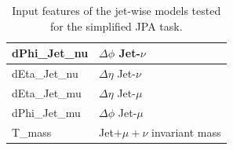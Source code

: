 \begin{minipage}{\linewidth}
\begin{minipage}{0.55\linewidth}
\begin{table}[H]
\begin{tabular}{l|l}
dPhi\_Jet\_nu & $\Delta \phi$ Jet-$\nu$\\
\midrule
dEta\_Jet\_nu & $\Delta \eta$ Jet-$\nu$\\
\midrule
dEta\_Jet\_mu & $\Delta \eta$ Jet-$\mu$\\
\midrule
dPhi\_Jet\_mu & $\Delta \phi$ Jet-$\mu$ \\
\midrule
T\_mass &  Jet$+\mu+\nu$ invariant mass\\
\bottomrule
\end{tabular}
\caption{Input features of the jet-wise models tested for the simplified JPA task.\\}
\label{tab:jet_inputs}
\end{table}
\end{minipage} 
\end{minipage}








